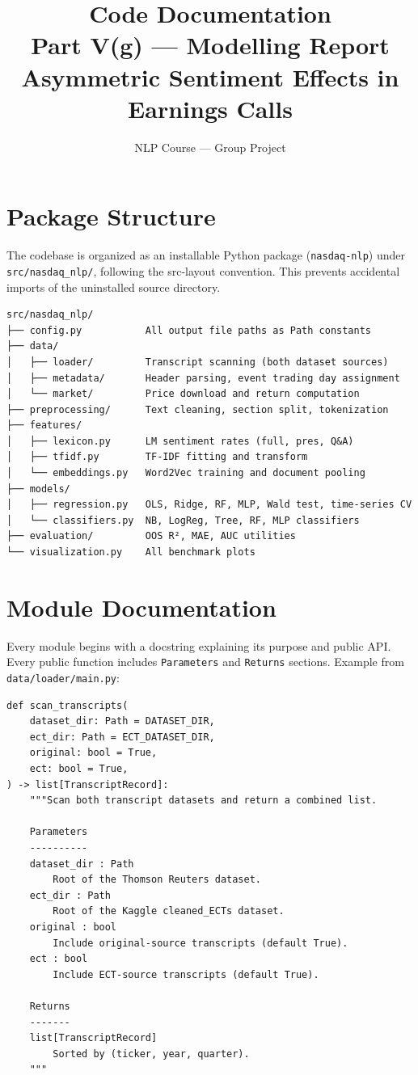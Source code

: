 \documentclass[12pt,a4paper]{article}
\title{\textbf{Code Documentation}\\[0.3em]
\large Part V(g) --- Modelling Report\\
Asymmetric Sentiment Effects in Earnings Calls}
\author{NLP Course --- Group Project}
\date{}
\begin{document}
\maketitle

\section{Package Structure}

The codebase is organized as an installable Python package (\texttt{nasdaq-nlp})
under \texttt{src/nasdaq\_nlp/}, following the src-layout convention.
This prevents accidental imports of the uninstalled source directory.

\begin{verbatim}
src/nasdaq_nlp/
├── config.py           All output file paths as Path constants
├── data/
│   ├── loader/         Transcript scanning (both dataset sources)
│   ├── metadata/       Header parsing, event trading day assignment
│   └── market/         Price download and return computation
├── preprocessing/      Text cleaning, section split, tokenization
├── features/
│   ├── lexicon.py      LM sentiment rates (full, pres, Q&A)
│   ├── tfidf.py        TF-IDF fitting and transform
│   └── embeddings.py   Word2Vec training and document pooling
├── models/
│   ├── regression.py   OLS, Ridge, RF, MLP, Wald test, time-series CV
│   └── classifiers.py  NB, LogReg, Tree, RF, MLP classifiers
├── evaluation/         OOS R², MAE, AUC utilities
└── visualization.py    All benchmark plots
\end{verbatim}

\section{Module Documentation}

Every module begins with a docstring explaining its purpose and public API.
Every public function includes \texttt{Parameters} and \texttt{Returns} sections.
Example from \texttt{data/loader/main.py}:

\begin{verbatim}
def scan_transcripts(
    dataset_dir: Path = DATASET_DIR,
    ect_dir: Path = ECT_DATASET_DIR,
    original: bool = True,
    ect: bool = True,
) -> list[TranscriptRecord]:
    """Scan both transcript datasets and return a combined list.

    Parameters
    ----------
    dataset_dir : Path
        Root of the Thomson Reuters dataset.
    ect_dir : Path
        Root of the Kaggle cleaned_ECTs dataset.
    original : bool
        Include original-source transcripts (default True).
    ect : bool
        Include ECT-source transcripts (default True).

    Returns
    -------
    list[TranscriptRecord]
        Sorted by (ticker, year, quarter).
    """
\end{verbatim}
\end{document}
